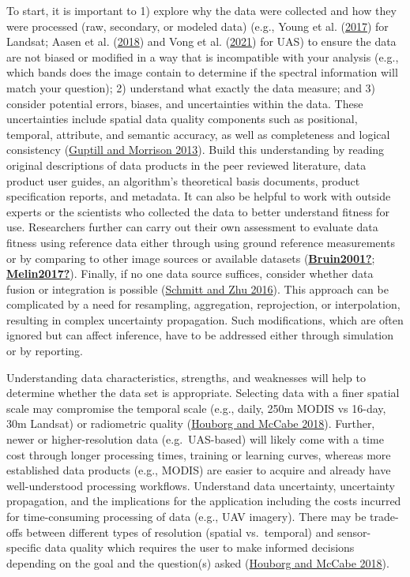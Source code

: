 \documentclass[
  12pt,
]{article}
\begin{document}
To start, it is important to 1) explore why the data were collected and
how they were processed (raw, secondary, or modeled data) (e.g., Young
et al. (\protect\hyperlink{ref-young2017}{2017}) for Landsat; Aasen et
al. (\protect\hyperlink{ref-aasen2018}{2018}) and Vong et al.
(\protect\hyperlink{ref-vong2021}{2021}) for UAS) to ensure the data are
not biased or modified in a way that is incompatible with your analysis
(e.g., which bands does the image contain to determine if the spectral
information will match your question); 2) understand what exactly the
data measure; and 3) consider potential errors, biases, and
uncertainties within the data. These uncertainties include spatial data
quality components such as positional, temporal, attribute, and semantic
accuracy, as well as completeness and logical consistency
(\protect\hyperlink{ref-guptill2013elements}{Guptill and Morrison
2013}). Build this understanding by reading original descriptions of
data products in the peer reviewed literature, data product user guides,
an algorithm's theoretical basis documents, product specification
reports, and metadata. It can also be helpful to work with outside
experts or the scientists who collected the data to better understand
fitness for use. Researchers further can carry out their own assessment
to evaluate data fitness using reference data either through using
ground reference measurements or by comparing to other image sources or
available datasets
(\protect\hyperlink{ref-Bruin2001}{\textbf{Bruin2001?}};
\protect\hyperlink{ref-Melin2017}{\textbf{Melin2017?}}). Finally, if no
one data source suffices, consider whether data fusion or integration is
possible (\protect\hyperlink{ref-schmitt2016data}{Schmitt and Zhu
2016}). This approach can be complicated by a need for resampling,
aggregation, reprojection, or interpolation, resulting in complex
uncertainty propagation. Such modifications, which are often ignored but
can affect inference, have to be addressed either through simulation or
by reporting.

Understanding data characteristics, strengths, and weaknesses will help
to determine whether the data set is appropriate. Selecting data with a
finer spatial scale may compromise the temporal scale (e.g., daily, 250m
MODIS vs 16-day, 30m Landsat) or radiometric quality
(\protect\hyperlink{ref-houborg2018}{Houborg and McCabe 2018}). Further,
newer or higher-resolution data (e.g.~UAS-based) will likely come with a
time cost through longer processing times, training or learning curves,
whereas more established data products (e.g., MODIS) are easier to
acquire and already have well-understood processing workflows.
Understand data uncertainty, uncertainty propagation, and the
implications for the application including the costs incurred for
time-consuming processing of data (e.g., UAV imagery). There may be
trade-offs between different types of resolution (spatial vs.~temporal)
and sensor-specific data quality which requires the user to make
informed decisions depending on the goal and the question(s) asked
(\protect\hyperlink{ref-houborg2018}{Houborg and McCabe 2018}).
\end{document}
